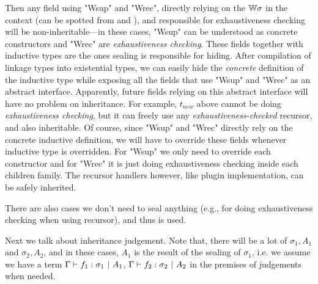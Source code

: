 Then any field using "Wsup" and "Wrec", directly relying on the
${\mathbb{W}}\sigma$ in the context (can be spotted from  and
), and responsible for exhaustiveness checking will be non-inheritable---in these cases, "Wsup"
can be understood as concrete constructors and "Wrec" are
\textit{exhaustiveness checking}. These fields together with inductive
types are the ones sealing is responsible for hiding.
After compilation
of linkage types into existential types, we can easily hide the
\textit{concrete} definition of the inductive type while exposing all
the fields that use "Wsup" and "Wrec" as an abstract interface.
Apparently, future fields relying on this abstract interface will have no
problem on inheritance. 
For example, $t_{new}$ above cannot be doing \textit{exhaustiveness
checking}, but it can freely use any \textit{exhaustiveness-checked}
recursor, and also inheritable.
Of course, since "Wsup" and "Wrec" directly rely on the concrete inductive definition, we will have to override these fields whenever inductive type is overridden. For "Wsup" we only need to override each constructor and for "Wrec" it is just doing exhaustiveness checking inside each children family. The recursor handlers however, like plugin implementation, can be safely inherited.

There are also cases we don't need to seal anything (e.g., for doing
exhaustiveness checking when using recursor), and thus  is
used. 





Next we talk about inheritance judgement. Note that, there will be a lot of $\sigma_1, A_1$ and $\sigma_2, A_2$, and in these cases, $A_1$ is the result of the sealing of $\sigma_1$, i.e. we assume we have a term ${ {\Gamma} \vdash {f_1} : {\sigma_1} \ |\ {A_1} }$, ${ {\Gamma} \vdash {f_2} : {\sigma_2} \ |\ {A_2} }$ in the premises of judgements when needed.



